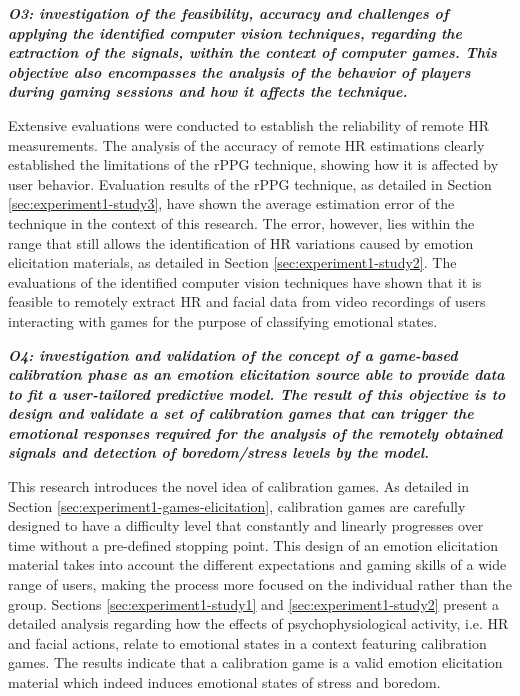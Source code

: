 \textit{\textbf{O3: investigation of the feasibility, accuracy and challenges of applying the identified computer vision techniques, regarding the extraction of the signals, within the context of computer games. This objective also encompasses the analysis of the behavior of players during gaming sessions and how it affects the technique.}}

Extensive evaluations were conducted to establish the reliability of remote HR measurements. The analysis of the accuracy of remote HR estimations clearly established the limitations of the rPPG technique, showing how it is affected by user behavior. Evaluation results of the rPPG technique, as detailed in Section \ref{sec:experiment1-study3}, have shown the average estimation error of the technique in the context of this research. The error, however, lies within the range that still allows the identification of HR variations caused by emotion elicitation materials, as detailed in Section \ref{sec:experiment1-study2}. The evaluations of the identified computer vision techniques have shown that it is feasible to remotely extract HR and facial data from video recordings of users interacting with games for the purpose of classifying emotional states.


\textit{\textbf{O4: investigation and validation of the concept of a game-based calibration phase as an emotion elicitation source able to provide data to fit a user-tailored predictive model. The result of this objective is to design and validate a set of calibration games that can trigger the emotional responses required for the analysis of the remotely obtained signals and detection of boredom/stress levels by the model.}}

This research introduces the novel idea of calibration games. As detailed in Section \ref{sec:experiment1-games-elicitation}, calibration games are carefully designed to have a difficulty level that constantly and linearly progresses over time without a pre-defined stopping point. This design of an emotion elicitation material takes into account the different expectations and gaming skills of a wide range of users, making the process more focused on the individual rather than the group. Sections \ref{sec:experiment1-study1} and \ref{sec:experiment1-study2} present a detailed analysis regarding how the effects of psychophysiological activity, i.e. HR and facial actions, relate to emotional states in a context featuring calibration games. The results indicate that a calibration game is a valid emotion elicitation material which indeed induces emotional states of stress and boredom.

